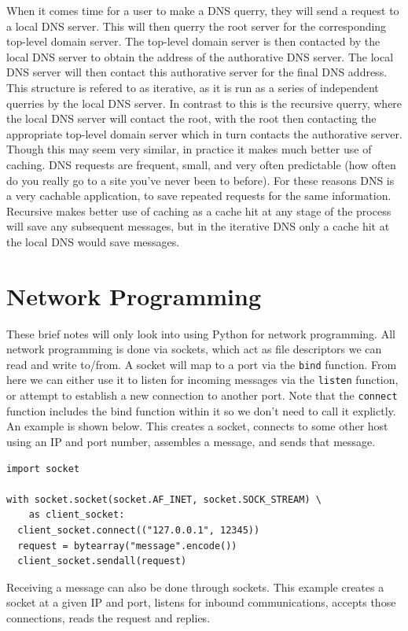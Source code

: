 When it comes time for a user to make a DNS querry, they will send a request to a local DNS server. This will then querry the root server for the corresponding top-level domain server. The top-level domain server is then contacted by the local DNS server to obtain the address of the authorative DNS server. The local DNS server will then contact this authorative server for the final DNS address. This structure is refered to as iterative, as it is run as a series of independent querries by the local DNS server. In contrast to this is the recursive querry, where the local DNS server will contact the root, with the root then contacting the appropriate top-level domain server which in turn contacts the authorative server. Though this may seem very similar, in practice it makes much better use of caching. DNS requests are frequent, small, and very often predictable (how often do you really go to a site you've never been to before). For these reasons DNS is a very cachable application, to save repeated requests for the same information. Recursive makes better use of caching as a cache hit at any stage of the process will save any subsequent messages, but in the iterative DNS only a cache hit at the local DNS would save messages.

\section{Network Programming}
These brief notes will only look into using Python for network programming. All network programming is done via sockets, which act as file descriptors we can read and write to/from. A socket will map to a port via the \texttt{bind} function. From here we can either use it to listen for incoming messages via the \texttt{listen} function, or attempt to establish a new connection to another port. Note that the \texttt{connect} function includes the bind function within it so we don't need to call it explictly. An example is shown below. This creates a socket, connects to some other host using an IP and port number, assembles a message, and sends that message.

\begin{lstlisting}
import socket

with socket.socket(socket.AF_INET, socket.SOCK_STREAM) \
    as client_socket:
  client_socket.connect(("127.0.0.1", 12345))
  request = bytearray("message".encode())
  client_socket.sendall(request)
\end{lstlisting}

Receiving a message can also be done through sockets. This example creates a socket at a given IP and port, listens for inbound communications, accepts those connections, reads the request and replies.

